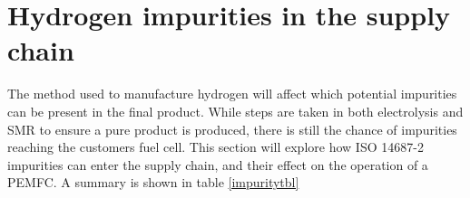 \section{Hydrogen impurities in the supply chain}
The method used to manufacture hydrogen will affect which potential impurities can be present in the final product. While steps are taken in both electrolysis and SMR to ensure a pure product is produced, there is still the chance of impurities reaching the customers fuel cell. This section will explore how ISO 14687-2 impurities can enter the supply chain, and their effect on the operation of a PEMFC. A summary is shown in table \ref{impuritytbl}
\begin{table}[]
    \caption{Summary of ISO 14687-2 impurities in the supply chain and their effects on fuel cell operation adapted from \cite{Bacquart2018}}
\end{table}
